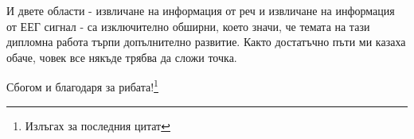 \documentclass[main.tex]{subfiles}
\begin{document}
И двете области - извличане на информация от реч и извличане на информация от ЕЕГ сигнал - са изключително обширни, което значи, че темата на тази дипломна работа търпи допълнително развитие. Както достатъчно пъти ми казаха обаче, човек все някъде трябва да сложи точка.

{\footnotesize Сбогом и благодаря за рибата!\footnote{Излъгах за последния цитат}}
\end{document}
